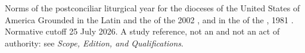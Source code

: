 {Norms of the postconciliar liturgical year for the dioceses of the United States of America}
{Grounded in the Latin  and the
 of the 2002 ,
and in the  of the , 1981 .
Normative cutoff 25 July 2026. A study reference, not an  and not an act of authority:
see \emph{Scope, Edition, and Qualifications}.}

\begingroup
\small
\setlength{\parskip}{0pt}
\setcounter{tocdepth}{3}
\tableofcontents
\endgroup
